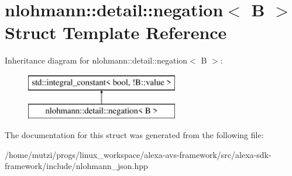 \hypertarget{structnlohmann_1_1detail_1_1negation}{}\section{nlohmann\+:\+:detail\+:\+:negation$<$ B $>$ Struct Template Reference}
\label{structnlohmann_1_1detail_1_1negation}
Inheritance diagram for nlohmann\+:\+:detail\+:\+:negation$<$ B $>$\+:\begin{figure}[H]
\begin{center}
\leavevmode
\includegraphics[height=2.000000cm]{d1/d91/structnlohmann_1_1detail_1_1negation}
\end{center}
\end{figure}


The documentation for this struct was generated from the following file\+:\begin{DoxyCompactItemize}
\item 
/home/mutzi/progs/linux\+\_\+workspace/alexa-\/avs-\/framework/src/alexa-\/sdk-\/framework/include/nlohmann\+\_\+json.\+hpp\end{DoxyCompactItemize}

